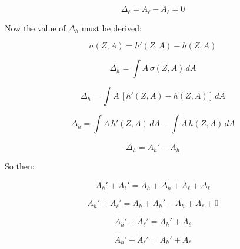 \documentclass{article}
\begin{document}
\begin{equation}
\Delta_\ell =\bar{A}_\ell  - \bar{A}_\ell = 0
\end{equation}


Now the value of $\Delta_h$ must be derived:

\[ \sigma(Z,A) = h'(Z,A) - h(Z,A) \]

\[ \Delta_h = \int A\, \sigma(Z,A)\, dA \]

\[ \Delta_h = \int A\, [h'(Z,A) - h(Z,A)]\, dA \]

\[ \Delta_h = \int A\, h'(Z,A)\, dA - \int A\, h(Z,A)\, dA \]

\begin{equation}
\Delta_h = \bar{A}_h' - \bar{A}_h
\end{equation}

So then: 

\[ \bar{A}_{h}' + \bar{A}_{\ell}' = \bar{A}_{h} + \Delta_h + \bar{A}_{\ell} + \Delta_\ell \]

\[ \bar{A}_{h}' + \bar{A}_{\ell}' = \bar{A}_{h} + \bar{A}_h' - \bar{A}_h + \bar{A}_{\ell} + 0 \]

\[ \bar{A}_{h}' + \bar{A}_{\ell}' = \bar{A}_h' + \bar{A}_{\ell} \]

\[ \bar{A}_{h}' + \bar{A}_{\ell}' = \bar{A}_h' + \bar{A}_{\ell} \]
\end{document}
